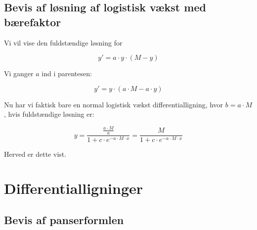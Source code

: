 \documentclass{article}
\makeatletter
\newenvironment{proofw}{\par
  \pushQED{\qed}%
  \normalfont \topsep6\p@\@plus6\p@\relax
  \trivlist
  \item[]\ignorespaces
}{%
  \popQED\endtrivlist\@endpefalse
}
\makeatother
\begin{document}
\subsection{Bevis af løsning af logistisk vækst med bærefaktor}

\begin{proofw}
    
Vi vil vise den fuldstændige løsning for 

$$y'=a \cdot y \cdot (M-y)$$

Vi ganger $a$ ind i parentesen:

$$y'=y \cdot (a\cdot M-a \cdot y)$$

Nu har vi faktisk bare en normal logistisk vækst differentialligning,
hvor $b=a \cdot M$, hvis fuldstændige løsning er:

$$
    y=\frac{
\frac{a \cdot M}{a}
    }{
        1+c \cdot e^{-a\cdot M \cdot x}
    }=
    \frac{
M
    }{
        1+c \cdot e^{-a\cdot M \cdot x}
    }
$$

Herved er dette vist.

\end{proofw}

\section{Differentialligninger}

\subsection{Bevis af panserformlen}
\end{document}
